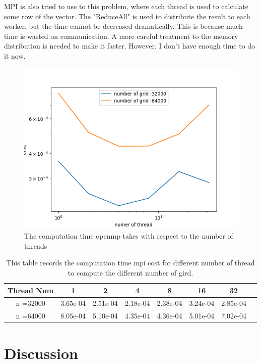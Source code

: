 \documentclass[11pt]{article}
\begin{document}
MPI is also tried to use to this problem, where each thread is used to calculate some row of the vector. The "ReduceAll" is used to distribute the result to each worker, but the time cannot be decreased dramatically.
This is because much time is wasted on communication. A more careful treatment to the memory distribution is needed to make it faster. However, I don't have enough time to do it now.
\begin{figure}
    \centering
    \includegraphics[width = 0.5\linewidth]{../CPP_code/1D_problem/mpi_version_gauss_seidel/mpi_result.png}
    \caption{The computation time openmp takes with respect to the number of threads}
    \label{fig:openmp result}
\end{figure}
\begin{table}[htp]
    \centering
    \begin{tabular}{|c|c|c|c|c|c|c|c|}
    \hline
    Thread Num & 1 & 2 & 4 & 8 & 16 & 32 \\
    \hline
    n =32000     &3.65e-04 &2.51e-04 &2.18e-04 &2.38e-04 &3.24e-04 &2.85e-04  \\
    \hline
    n =64000     &8.05e-04 &5.10e-04 &4.35e-04 &4.36e-04 &5.01e-04 &7.02e-04\\
    \hline
    \end{tabular}
    \caption{This table records the computation time mpi cost for different number of thread to compute the different number of gird.}
    \label{tab:mpi table}
\end{table}
\section{Discussion}
\end{document}
